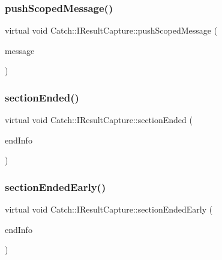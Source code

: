 \mbox{\label{struct_catch_1_1_i_result_capture_a91d154c1e087e383dcde5aad95cb6a05}} 
\subsubsection{\texorpdfstring{pushScopedMessage()}{pushScopedMessage()}}
{\footnotesize\ttfamily virtual void Catch\+::\+I\+Result\+Capture\+::push\+Scoped\+Message (\begin{DoxyParamCaption}\item[{\mbox{\hyperlink{struct_catch_1_1_message_info}{Message\+Info}} const \&}]{message }\end{DoxyParamCaption})\hspace{0.3cm}{\ttfamily [pure virtual]}}

\mbox{\label{struct_catch_1_1_i_result_capture_a4e152bc43dc0933684e31fa67a58195d}} 
\subsubsection{\texorpdfstring{sectionEnded()}{sectionEnded()}}
{\footnotesize\ttfamily virtual void Catch\+::\+I\+Result\+Capture\+::section\+Ended (\begin{DoxyParamCaption}\item[{\mbox{\hyperlink{struct_catch_1_1_section_end_info}{Section\+End\+Info}} const \&}]{end\+Info }\end{DoxyParamCaption})\hspace{0.3cm}{\ttfamily [pure virtual]}}

\mbox{\label{struct_catch_1_1_i_result_capture_afcc71eef8ca821ae132cced4a2be6988}} 
\subsubsection{\texorpdfstring{sectionEndedEarly()}{sectionEndedEarly()}}
{\footnotesize\ttfamily virtual void Catch\+::\+I\+Result\+Capture\+::section\+Ended\+Early (\begin{DoxyParamCaption}\item[{\mbox{\hyperlink{struct_catch_1_1_section_end_info}{Section\+End\+Info}} const \&}]{end\+Info }\end{DoxyParamCaption})\hspace{0.3cm}{\ttfamily [pure virtual]}}


